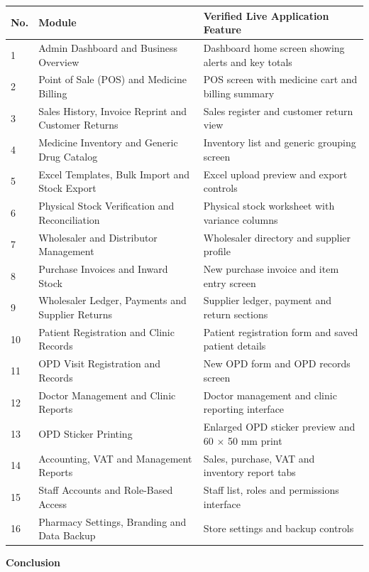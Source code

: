 \documentclass[11pt,a4paper]{article}
\newcommand{\chaptertitle}[1]{%
    \vspace*{0.2cm}%
    {\normalfont\LARGE\bfseries\color{HeaderNavy} #1}%
    \vspace*{0.3cm}\par%
}
\begin{document}
\begin{center}
\begin{tabularx}{\textwidth}{p{1.2cm}p{5.5cm}X}
\toprule
\textbf{No.} & \textbf{Module} & \textbf{Verified Live Application Feature} \\
\midrule
1 & Admin Dashboard and Business Overview & Dashboard home screen showing alerts and key totals \\
2 & Point of Sale (POS) and Medicine Billing & POS screen with medicine cart and billing summary \\
3 & Sales History, Invoice Reprint and Customer Returns & Sales register and customer return view \\
4 & Medicine Inventory and Generic Drug Catalog & Inventory list and generic grouping screen \\
5 & Excel Templates, Bulk Import and Stock Export & Excel upload preview and export controls \\
6 & Physical Stock Verification and Reconciliation & Physical stock worksheet with variance columns \\
7 & Wholesaler and Distributor Management & Wholesaler directory and supplier profile \\
8 & Purchase Invoices and Inward Stock & New purchase invoice and item entry screen \\
9 & Wholesaler Ledger, Payments and Supplier Returns & Supplier ledger, payment and return sections \\
10 & Patient Registration and Clinic Records & Patient registration form and saved patient details \\
11 & OPD Visit Registration and Records & New OPD form and OPD records screen \\
12 & Doctor Management and Clinic Reports & Doctor management and clinic reporting interface \\
13 & OPD Sticker Printing & Enlarged OPD sticker preview and 60 $\times$ 50 mm print \\
14 & Accounting, VAT and Management Reports & Sales, purchase, VAT and inventory report tabs \\
15 & Staff Accounts and Role-Based Access & Staff list, roles and permissions interface \\
16 & Pharmacy Settings, Branding and Data Backup & Store settings and backup controls \\
\bottomrule
\end{tabularx}
\end{center}

\newpage
\chaptertitle{Conclusion}
\end{document}
